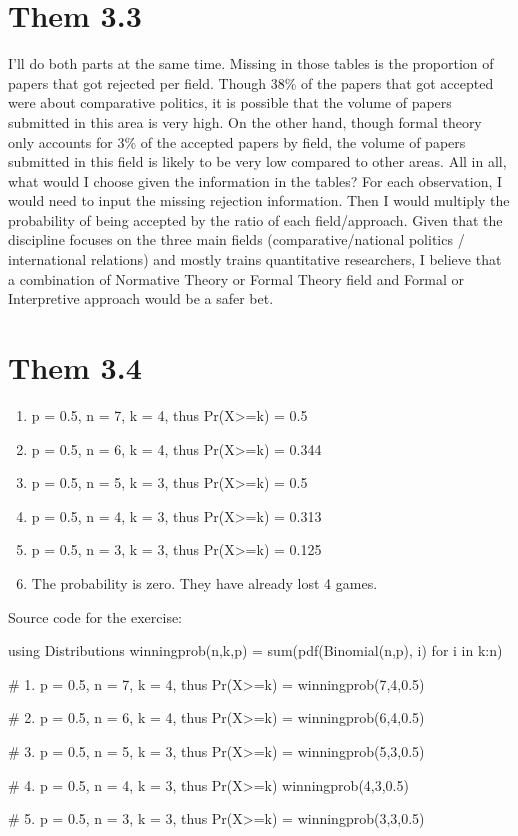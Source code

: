 \documentclass[11pt]{article}
\begin{document}
\section*{Them 3.3}
\label{sec:orgc85bc02}
I'll do both parts at the same time. Missing in those tables is the proportion of papers that got rejected per field. Though 38\% of the papers that got accepted were about comparative politics, it is possible that the volume of papers submitted in this area is very high. On the other hand, though formal theory only accounts for 3\% of the accepted papers by field, the volume of papers submitted in this field is likely to be very low compared to other areas. All in all, what would I choose given the information in the tables? For each observation, I would need to input the missing rejection information. Then I would multiply the probability of being accepted by the ratio of each field/approach. Given that the discipline focuses on the three main fields (comparative/national politics / international relations) and mostly trains quantitative researchers, I believe that a combination of Normative Theory or Formal Theory field and Formal or Interpretive approach would be a safer bet.

\section*{Them 3.4}
\label{sec:org0cdf171}

\begin{enumerate}
\item p = 0.5, n = 7,  k = 4, thus Pr(X>=k) = 0.5
\item p = 0.5, n = 6, k = 4,  thus Pr(X>=k) = 0.344
\item p = 0.5, n = 5, k = 3, thus Pr(X>=k) = 0.5
\item p = 0.5, n = 4, k = 3, thus Pr(X>=k) = 0.313
\item p = 0.5, n = 3, k = 3, thus Pr(X>=k) = 0.125
\item The probability is zero. They have already lost 4 games.
\end{enumerate}

Source code for the exercise:
\begin{jllisting}
using Distributions
winningprob(n,k,p) = sum(pdf(Binomial(n,p), i) for i in k:n)

# 1. p = 0.5, n = 7, k = 4, thus Pr(X>=k) =
winningprob(7,4,0.5)

# 2. p = 0.5, n = 6, k = 4, thus Pr(X>=k) =
winningprob(6,4,0.5)

# 3. p = 0.5, n = 5, k = 3, thus Pr(X>=k) =
winningprob(5,3,0.5)

# 4.  p = 0.5, n = 4, k = 3, thus Pr(X>=k)
winningprob(4,3,0.5)

# 5. p = 0.5, n = 3, k = 3, thus Pr(X>=k) =
winningprob(3,3,0.5)

\end{jllisting}
\end{document}
